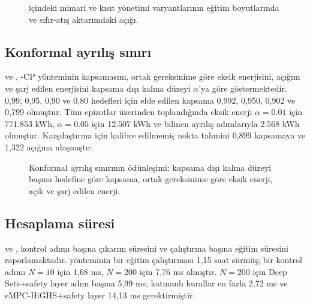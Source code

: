 
\begin{figure}[t]
\centering
{}
\caption{ içindeki mimari ve kısıt yönetimi varyantlarının eğitim boyutlarında ve sıfır-atış aktarımdaki açığı.}
\label{fig:ablation}
\end{figure}


\subsection{Konformal ayrılış sınırı}\label{app:res-conformal}

 ve , \method{}-CP yönteminin kapsamasını, ortak gereksinime göre eksik enerjisini, açığını ve şarj edilen enerjisini kapsama dışı kalma düzeyi $\alpha$'ya göre göstermektedir.
0,99, 0,95, 0,90 ve 0,80 hedefleri için elde edilen kapsama 0,992, 0,950, 0,902 ve 0,799 olmuştur.
Tüm epizotlar üzerinden toplandığında eksik enerji $\alpha=0.01$ için 771.853 kWh, $\alpha=0.05$ için 12.507 kWh ve bilinen ayrılış adımlarıyla 2.568 kWh olmuştur.
Karşılaştırma için kalibre edilmemiş nokta tahmini 0,899 kapsamaya ve 1,322 açığına ulaşmıştır.

\begin{figure}[t]
\centering
{}
\caption{Konformal ayrılış sınırının ödünleşimi: kapsama dışı kalma düzeyi başına hedefine göre kapsama, ortak gereksinime göre eksik enerji, açık ve şarj edilen enerji.}
\label{fig:conformal}
\end{figure}


\subsection{Hesaplama süresi}\label{app:res-time}

 ve , kontrol adımı başına çıkarım süresini ve çalıştırma başına eğitim süresini raporlamaktadır.
\method{} yönteminin bir eğitim çalıştırması 1,15 saat sürmüş; bir kontrol adımı $N=10$ için 1,68 ms, $N=200$ için 7,76 ms almıştır.
$N=200$ için Deep Sets+safety layer adım başına 5,99 ms, katmanlı kurallar en fazla 2,72 ms ve eMPC-HiGHS+safety layer 14,13 ms gerektirmiştir.

